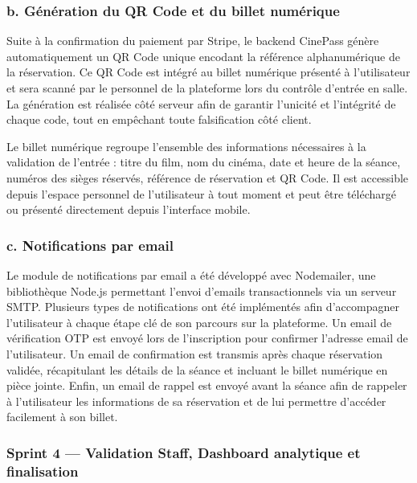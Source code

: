 \documentclass[12pt]{report}
\begin{document}
\subsubsection{b. \quad Génération du QR Code et du billet numérique}

Suite à la confirmation du paiement par Stripe, le backend CinePass génère automatiquement un QR Code unique encodant la référence alphanumérique de la réservation. Ce QR Code est intégré au billet numérique présenté à l'utilisateur et sera scanné par le personnel de la plateforme lors du contrôle d'entrée en salle. La génération est réalisée côté serveur afin de garantir l'unicité et l'intégrité de chaque code, tout en empêchant toute falsification côté client.

Le billet numérique regroupe l'ensemble des informations nécessaires à la validation de l'entrée : titre du film, nom du cinéma, date et heure de la séance, numéros des sièges réservés, référence de réservation et QR Code. Il est accessible depuis l'espace personnel de l'utilisateur à tout moment et peut être téléchargé ou présenté directement depuis l'interface mobile.

\subsubsection{c. \quad Notifications par email}

Le module de notifications par email a été développé avec Nodemailer, une bibliothèque Node.js permettant l'envoi d'emails transactionnels via un serveur SMTP. Plusieurs types de notifications ont été implémentés afin d'accompagner l'utilisateur à chaque étape clé de son parcours sur la plateforme. Un email de vérification OTP est envoyé lors de l'inscription pour confirmer l'adresse email de l'utilisateur. Un email de confirmation est transmis après chaque réservation validée, récapitulant les détails de la séance et incluant le billet numérique en pièce jointe. Enfin, un email de rappel est envoyé avant la séance afin de rappeler à l'utilisateur les informations de sa réservation et de lui permettre d'accéder facilement à son billet.

\subsubsection{Sprint 4 — Validation Staff, Dashboard analytique et finalisation}
\end{document}

